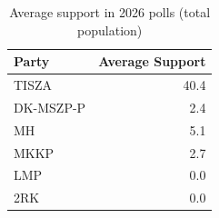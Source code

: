 \begin{table}
\caption{Average support in 2026 polls (total population)}
\label{tab:poll_threshold_2026}
\begin{tabular}{lr}
\toprule
Party & Average Support \\
\midrule
TISZA & 40.4 \\
DK-MSZP-P & 2.4 \\
MH & 5.1 \\
MKKP & 2.7 \\
LMP & 0.0 \\
2RK & 0.0 \\
\bottomrule
\end{tabular}
\end{table}
